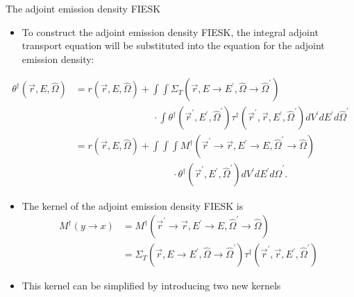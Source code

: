 \documentclass{beamer}
\begin{document}
\begin{frame}{The adjoint emission density FIESK}

  \begin{itemize}
    \item To construct the adjoint emission density FIESK, the integral 
      adjoint transport equation will be substituted into the equation for
      the adjoint emission density:
  \end{itemize}
  \begin{align}
    \theta^{\dagger}(\vec{r},E,\hat{\Omega}) & = r(\vec{r},E,\hat{\Omega}) +
    \int\int \Sigma_T(\vec{r},E \to E^{'},\hat{\Omega} \to \hat{\Omega}^{'})
    \nonumber \\
    & \qquad \qquad \qquad \qquad \cdot
    \int \theta^{\dagger}(\vec{r}^{'},E^{'},\hat{\Omega}^{'}) 
    \tau^{\dagger}(\vec{r}^{'},\vec{r},E^{'},\hat{\Omega}^{'}) 
    dV^{'} dE^{'} d\hat{\Omega}^{'} \nonumber \\
    & = r(\vec{r},E,\hat{\Omega}) +
    \int\int\int M^{\dagger}(\vec{r}^{'} \to \vec{r},E^{'} \to E,
        \hat{\Omega}^{'} \to \hat{\Omega}) \nonumber \\
         & \qquad \qquad \qquad \qquad \qquad \cdot
         \theta^{\dagger}(\vec{r}^{'},E^{'},\hat{\Omega}^{'}) 
         dV^{'} dE^{'} d\hat{\Omega}^{'}. \nonumber
  \end{align}

  \begin{itemize}
    \item The kernel of the adjoint emission density FIESK is
      \begin{align}
        M^{\dagger}(y \to x) & = M^{\dagger}(\vec{r}^{'} \to \vec{r},E^{'} \to E,
        \hat{\Omega}^{'} \to \hat{\Omega}) \nonumber \\
        & = \Sigma_T(\vec{r},E \to E^{'},\hat{\Omega} \to \hat{\Omega}^{'})
        \tau^{\dagger}(\vec{r}^{'},\vec{r},E^{'},\hat{\Omega}^{'}) \nonumber
      \end{align}
    \item This kernel can be simplified by introducing two new kernels
  \end{itemize}

\end{frame}
\end{document}
